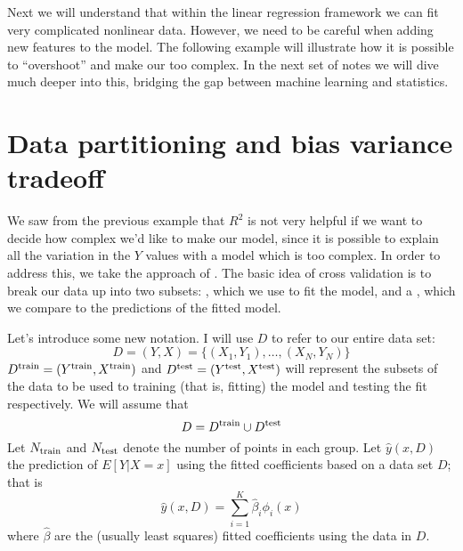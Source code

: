 Next we will  understand that within the linear regression framework we can fit very complicated nonlinear data. However, we need to be careful when adding new features to the model. The following example will illustrate how it is possible to ``overshoot'' and make our too complex. In the next set of notes we will dive much deeper into this, bridging the gap between machine learning and statistics. 


\section{Data partitioning and bias variance tradeoff}

We saw from the previous example that $R^2$ is not very helpful if we want to decide how complex we'd like to make our model, since it is possible to explain all the variation in the $Y$ values with a model which is too complex. In order to address this, we take the approach of . The basic idea of cross validation is to break our data up into two subsets: , which we use to fit the model, and a , which we compare to the predictions of the fitted model. 

Let's introduce some new notation. 
 I will use $D$ to refer to our entire data set:
\begin{equation*}
D = (Y,X) = \{(X_1,Y_1),\dots,(X_N,Y_N)\}
\end{equation*}
 $D^{\rm train} = (Y^{\rm train},X^{\rm train})$ and $D^{\rm test} = (Y^{\rm test},X^{\rm test})$ will represent the subsets of the data to be used to training (that is, fitting) the model and testing the fit respectively.  We will assume that
\begin{equation*}
D = D^{\rm train} \cup D^{\rm test}
\end{equation*}
 Let $N_{\rm train}$ and $N_{\rm test}$ denote the number of points in each group.
 Let $\hat{y}(x,D)$ the prediction of $E[Y|X =x]$ using the fitted coefficients based on a data set $D$; that is
\begin{equation*}
\hat{y}(x,D) = \sum_{i=1}^{K}\hat{\beta}_i\phi_i(x)
\end{equation*} 
where $\hat{\beta}$ are the (usually least squares) fitted coefficients using the data in $D$. 




